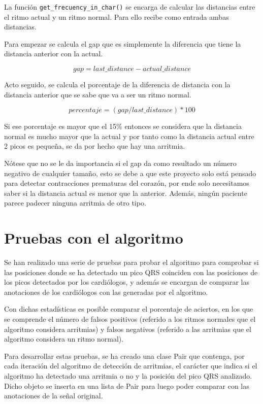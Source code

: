 \FloatBarrier

La función \lstinline{get_frecuency_in_char()} se encarga de calcular las distancias entre el ritmo actual y un ritmo normal. 
Para ello recibe como entrada ambas distancias.

Para empezar se calcula el gap que es simplemente la diferencia que tiene la distancia anterior con la actual.

\[gap = last\_distance - actual\_distance\]

Acto seguido, se calcula el porcentaje de la diferencia de distancia con la distancia anterior que se sabe que va a ser 
un ritmo normal.

\[percentaje = (gap / last\_distance) * 100\]

Si ese porcentaje es mayor que el 15\% entonces se considera que la distancia normal es mucho mayor que la actual
y por tanto como la distancia actual entre 2 picos es pequeña, se da por hecho que hay una arritmia.

Nótese que no se le da importancia si el gap da como resultado un número negativo de cualquier tamaño, esto se debe
a que este proyecto solo está pensado para detectar contracciones prematuras del corazón, por ende solo necesitamos 
saber si la distancia actual es menor que la anterior. Además, ningún paciente parece padecer ninguna arritmia de otro
tipo.

\section{Pruebas con el algoritmo}

Se han realizado una serie de pruebas para probar el algoritmo para comprobar si las posiciones donde
se ha detectado un pico QRS coinciden con las posiciones de los picos detectados por los cardiólogos, y además se 
encargan de comparar las anotaciones de los cardiólogos con las generadas por el algoritmo.

Con dichas estadísticas es posible comparar el porcentaje de aciertos, en los que se comprende el número de 
falsos positivos (referido a los ritmos normales que el algoritmo considera arritmias) y 
falsos negativos (referido a las arritmias que el algoritmo considera un ritmo normal).

Para desarrollar estas pruebas, se ha creado una clase Pair que contenga, por cada iteración del algoritmo de detección de arritmias, el carácter que indica si el algoritmo ha detectado una arritmia o no y la posición del pico QRS analizado. Dicho objeto se inserta en una lista de Pair para luego poder comparar con las anotaciones de la señal original.

